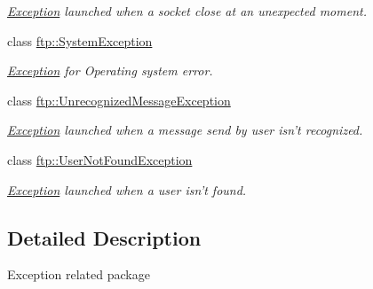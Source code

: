 \begin{DoxyCompactItemize}
\begin{DoxyCompactList}\small\item\em \hyperlink{classftp_1_1_exception}{Exception} launched when a socket close at an unexpected moment. \end{DoxyCompactList}\item 
class \hyperlink{classftp_1_1_system_exception}{ftp\-::\-System\-Exception}
\begin{DoxyCompactList}\small\item\em \hyperlink{classftp_1_1_exception}{Exception} for Operating system error. \end{DoxyCompactList}\item 
class \hyperlink{classftp_1_1_unrecognized_message_exception}{ftp\-::\-Unrecognized\-Message\-Exception}
\begin{DoxyCompactList}\small\item\em \hyperlink{classftp_1_1_exception}{Exception} launched when a message send by user isn't recognized. \end{DoxyCompactList}\item 
class \hyperlink{classftp_1_1_user_not_found_exception}{ftp\-::\-User\-Not\-Found\-Exception}
\begin{DoxyCompactList}\small\item\em \hyperlink{classftp_1_1_exception}{Exception} launched when a user isn't found. \end{DoxyCompactList}\end{DoxyCompactItemize}


\subsection{Detailed Description}
Exception related package 